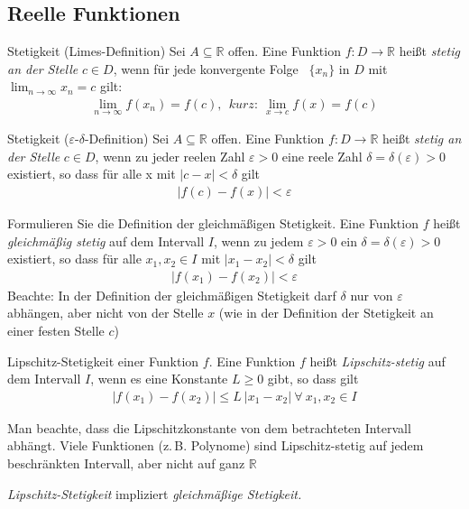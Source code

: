 \subsection{Reelle Funktionen}
\begin{karte}{Stetigkeit (Limes-Definition)}
	Sei \(A\subseteq\mathbb{R}\) offen. Eine Funktion \(f:D\to\mathbb{R}\) heißt \emph{stetig an der Stelle} \(c \in D\), wenn für jede konvergente Folge \ \( \{ x_{n} \} \) in \(D\) mit \(\displaystyle\lim_{n\to\infty} x_n = c\) gilt:
	\begin{align}
		\lim_{n\to\infty} f(x_n)=f(c),\ \ kurz:\ \lim_{x\to c}f(x)=f(c)
	\end{align}
\end{karte}

\begin{karte}{Stetigkeit (\(\varepsilon\text{-}\delta \)-Definition)}
	Sei \(A\subseteq\mathbb{R}\) offen. Eine Funktion \(f:D\to\mathbb{R}\) heißt \emph{stetig an der Stelle} \(c \in D\), wenn zu jeder reelen Zahl \(\varepsilon > 0\) eine reele Zahl \(\delta=\delta(\varepsilon)>0\) existiert, so dass für alle x mit \(|c-x|<\delta \) gilt
	\begin{align}
		|f(c)-f(x)|<\varepsilon
	\end{align}

\end{karte}

\begin{karte}{Formulieren Sie die Definition der gleichmäßigen Stetigkeit.}
	Eine Funktion \(f\) heißt \emph{gleichmäßig stetig} auf dem Intervall \(I\), wenn zu jedem \(\varepsilon > 0\) ein \(\delta = \delta(\varepsilon) > 0\) existiert, so dass für alle \(x_1,x_2 \in I\) mit \(\lvert x_1 - x_2 \rvert < \delta \) gilt
	\begin{align}
		\lvert f(x_1) - f(x_2) \rvert<\varepsilon
	\end{align}
	{\large
		Beachte: In der Definition der gleichmäßigen Stetigkeit darf \( \delta \) nur von \( \varepsilon \) abhängen, aber nicht von der Stelle \(x\) (wie in der Definition der Stetigkeit an einer festen Stelle \(c\))
	}
\end{karte}


\begin{karte}{Lipschitz-Stetigkeit einer Funktion \(f\).}%
	Eine Funktion \(f\) heißt \emph{Lipschitz-stetig} auf dem Intervall \(I\), wenn es eine Konstante \(L\geq0\) gibt, so dass gilt
	\begin{align}
		\lvert f(x_1) - f(x_2) \rvert\leq L\ \lvert x_1 - x_2 \rvert\  \forall \  x_1,x_2\in I
	\end{align}
	{\large Man beachte, dass die Lipschitzkonstante von dem betrachteten Intervall abhängt. Viele Funktionen (z.\,B. Polynome) sind Lipschitz-stetig auf jedem beschränkten Intervall, aber nicht auf ganz \(\mathbb{R}\)\par}
	\vspace{5mm}
	\emph{Lipschitz-Stetigkeit} impliziert \emph{gleichmäßige Stetigkeit.}

\end{karte}

